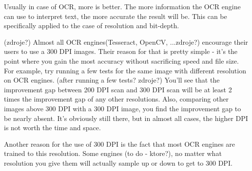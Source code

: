 Usually in case of OCR, more is better. The more information the OCR engine can use to interpret text, the more accurate the result will be. This can be specifically applied to the case of resolution and bit-depth.

(zdroje?)
Almost all OCR engines(Tesseract, OpenCV, ...zdroje?) encourage their users to use a 300 DPI images. Their reason for that is pretty simple - it's the point where you gain the most accuracy without sacrificing speed and file size. For example, try running a few tests for the same image with different resolution on OCR engines. (after running a few tests? zdroje?) You'll see that the improvement gap between 200 DPI scan and 300 DPI scan will be at least 2 times the improvement gap of any other resolutions. Also, comparing other images above 300 DPI with a 300 DPI image, you find the improvement gap to be nearly absent. It's obviously still there, but in almost all cases, the higher DPI is not worth the time and space. 

Another reason for the use of 300 DPI is the fact that most OCR engines are trained to this resolution. Some engines (to do - ktore?), no matter what resolution you give them will actually sample up or down to get to 300 DPI. 

